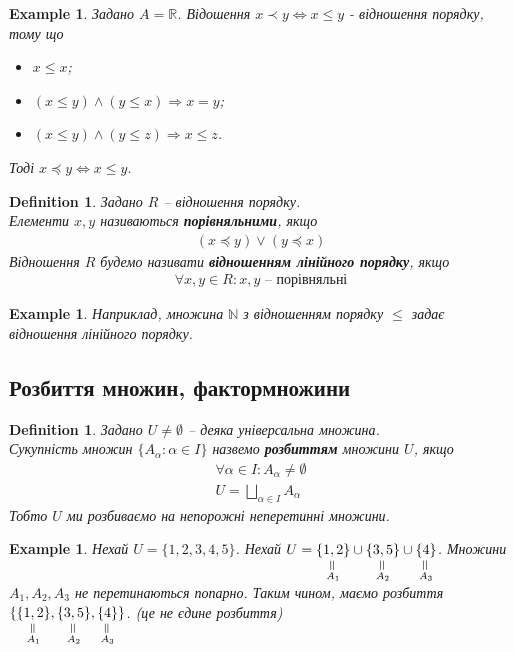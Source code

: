 \documentclass[a4paper, 14pt]{extarticle}
\def\huge{\displaystyle}
\theoremstyle{theoremdd}
\theoremstyle{theoremdd}
\newtheorem{definition}[theorem]{Definition}
\theoremstyle{theoremdd}
\theoremstyle{theoremdd}
\theoremstyle{theoremdd}
\newtheorem{example}[theorem]{Example}
\theoremstyle{theoremdd}
\theoremstyle{theoremdd}
\theoremstyle{theoremdd}
\theoremstyle{theoremdd}
\theoremstyle{theoremdd}
\theoremstyle{theoremdd}
\theoremstyle{theoremdd}
\theoremstyle{theoremdd}
\theoremstyle{theoremdd}
\theoremstyle{theoremdd}
\begin{document}
\begin{example}
Задано $A = \mathbb{R}$. Відошення $x \prec y \iff x \leq y$ - відношення порядку, тому що
\begin{itemize}[nosep,wide=0pt,label={-}]
\item $x \leq x$;
\item $(x \leq y) \wedge (y \leq x) \Rightarrow x = y$;
\item $(x \leq y) \wedge (y \leq z) \Rightarrow x \leq z$.
\end{itemize}
Тоді $x \preceq y \iff x \leq y$.
\end{example}

\begin{definition}
Задано $R$ -- відношення порядку.\\
Елементи $x,y$ називаються \textbf{порівняльними}, якщо
\begin{align*}
(x \preceq y) \vee (y \preceq x)
\end{align*}
Відношення $R$ будемо називати \textbf{відношенням лінійного порядку}, якщо
\begin{align*}
\forall x,y \in R: x,y \text{ -- порівняльні}
\end{align*}
\end{definition}

\begin{example}
Наприклад, множина $\mathbb{N}$ з відношенням порядку $\leq$ задає відношення лінійного порядку.
\end{example}

\subsection{Розбиття множин, фактормножини}
\begin{definition}
Задано $U \neq \emptyset$ -- деяка універсальна множина.\\
Сукупність множин $\{A_{\alpha}: \alpha \in I\}$ назвемо \textbf{розбиттям} множини $U$, якщо
\begin{align*}
\forall \alpha \in I: A_\alpha \neq \emptyset\\
U = \huge\bigsqcup_{\alpha \in I} A_\alpha
\end{align*}
Тобто $U$ ми розбиваємо на непорожні неперетинні множини.
\end{definition}

\begin{example}
Нехай $U = \{1,2,3,4,5\}$. Нехай $U = \underset{\substack{\rotatebox{90}{=} \\ A_1}}{\{1,2\}} \cup \underset{\substack{\rotatebox{90}{=} \\ A_2}}{\{3,5\}} \cup \underset{\substack{\rotatebox{90}{=} \\ A_3}}{\{4\}}$. Множини $A_1,A_2,A_3$ не перетинаються попарно. Таким чином, маємо розбиття $\{\underset{\substack{\rotatebox{90}{=} \\ A_1}}{\{1,2\}}, \underset{\substack{\rotatebox{90}{=} \\ A_2}}{\{3,5\}}, \underset{\substack{\rotatebox{90}{=} \\ A_3}}{\{4\}} \}$. (це не єдине розбиття)
\end{example}
\end{document}

